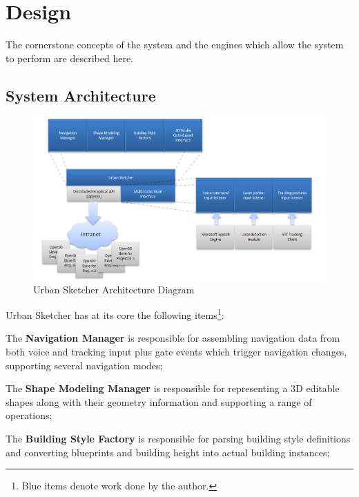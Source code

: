\chapter{Design}


The cornerstone concepts of the system and the engines which allow the system to perform are described here.


\section{System Architecture}

\begin{figure}[!ht]
		\centering
		\includegraphics[width=16cm]{gfx/charts/block-diagram.png}
		\caption{Urban Sketcher Architecture Diagram}
		\label{fig:block-diagram}
\end{figure}


Urban Sketcher has at its core the following items\footnote{Blue items denote work done by the author.}:

The \textbf{Navigation Manager} is
		responsible for assembling navigation data from
		both voice and tracking input plus gate events which trigger navigation changes,
		supporting several navigation modes;
	
The \textbf{Shape Modeling Manager} is
		responsible for representing a 3D editable shapes
		along with their geometry information and supporting a range of operations;
	
The \textbf{Building Style Factory} is
		responsible for parsing building style definitions
		and converting blueprints and building height into actual building instances;
	
